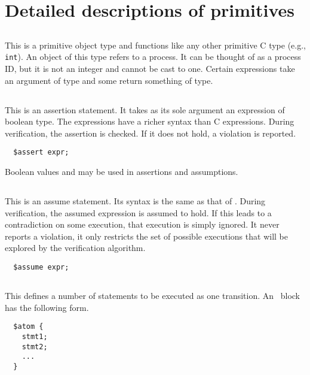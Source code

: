 \documentclass[11pt, oneside, letterpaper]{book}
\begin{document}
\section{Detailed descriptions of primitives}

\subsection{\cproc} This is a primitive object type and functions like
any other primitive C type (e.g., \texttt{int}).  An object of this
type refers to a process.  It can be thought of as a process ID, but
it is not an integer and cannot be cast to one.  Certain expressions
take an argument of \cproc{} type and some return something of
\cproc{} type.

\subsection{\cassert} This is an assertion statement.  It takes as its
sole argument an expression of boolean type.  The expressions have a
richer syntax than C expressions.  During verification, the assertion
is checked.  If it does not hold, a violation is reported.
\begin{verbatim}
  $assert expr;
\end{verbatim}
Boolean values \ctrue{} and \cfalse{} may be used in assertions
and assumptions.


\subsection{\cassume} This is an assume statement. Its syntax is the
same as that of \cassert.  During verification, the assumed expression
is assumed to hold.  If this leads to a contradiction on some
execution, that execution is simply ignored.  It never reports a
violation, it only restricts the set of possible executions that will
be explored by the verification algorithm.
\begin{verbatim}
  $assume expr;
\end{verbatim}

\subsection{\catom} This defines a number of statements to be executed as one transition.  An \catom~block has the following form.
\begin{verbatim}
  $atom {
    stmt1;
    stmt2;
    ...
  }
\end{verbatim}
\end{document}

